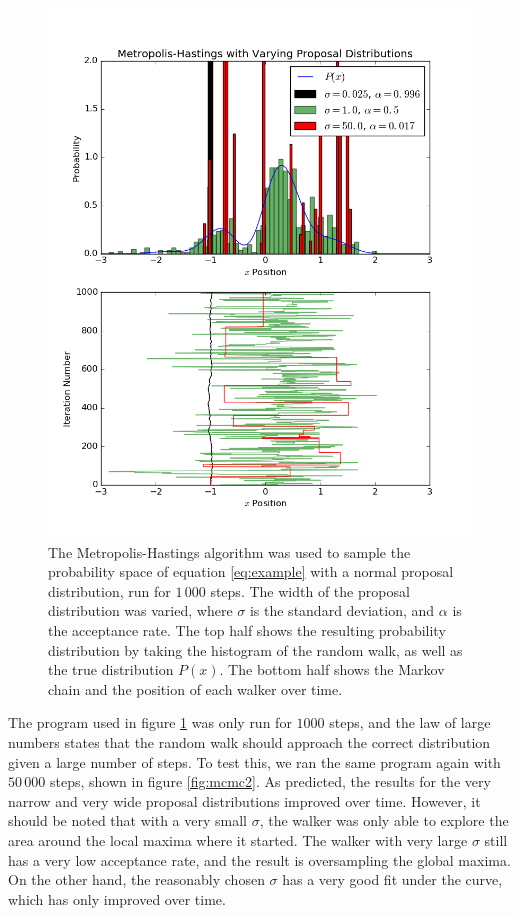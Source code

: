 \begin{figure}
  \centering
  \includegraphics[width=\linewidth]{mcmc1.png}
  \caption{
    The Metropolis-Hastings algorithm was used to sample the probability space
    of equation \ref{eq:example} with a normal proposal distribution, run for
    $1\,000$ steps. The width of the proposal distribution was varied, where
    $\sigma$ is the standard deviation, and $\alpha$ is the acceptance rate. The
    top half shows the resulting probability distribution by taking the
    histogram of the random walk, as well as the true distribution $P(x)$. The
    bottom half shows the Markov chain and the position of each walker over
    time.
  }
  \label{fig:mcmc1}
\end{figure}

The program used in figure \ref{fig:mcmc1} was only run for $1000$ steps, and
the law of large numbers states that the random walk should approach the correct
distribution given a large number of steps. To test this, we ran the same
program again with $50\,000$ steps, shown in figure \ref{fig:mcmc2}. As
predicted, the results for the very narrow and very wide proposal distributions
improved over time. However, it should be noted that with a very small $\sigma$,
the walker was only able to explore the area around the local maxima where it
started. The walker with very large $\sigma$ still has a very low acceptance
rate, and the result is oversampling the global maxima. On the other hand, the
reasonably chosen $\sigma$ has a very good fit under the curve, which has only
improved over time.

